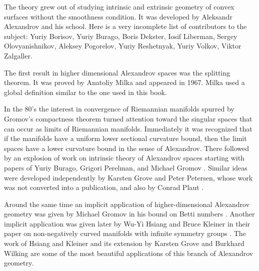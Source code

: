 The theory grew out of studying intrinsic and extrinsic geometry of convex surfaces without the smoothness condition.
It was developed by Aleksandr Alexandrov
and his school.
Here is a very incomplete list of contributors to the subject:
Yuriy  Borisov,
Yuriy  Burago,
Boris Dekster,
Iosif  Liberman,
Sergey  Olovyanishnikov,
Aleksey  Pogorelov,
Yuriy  Reshetnyak,
Yuriy  Volkov,
Viktor  Zalgaller.

The first result in higher dimensional Alexandrov spaces was the splitting theorem.
It was proved by Anatoliy Milka \cite{milka-line} and appeared in 1967.
Milka used a global definition similar to the one used in this book. %

{\sloppy 

In the 80's the interest in convergence of Riemannian manifolds spurred by Gromov's compactness theorem \cite{gromov-MS} turned attention toward the singular spaces that can occur as limits of Riemannian manifolds.
Immediately it was recognized that if the manifolds have a uniform lower sectional curvature bound, then the limit spaces have a lower curvature bound in the sense of Alexandrov. 
There followed by an explosion of work on intrinsic theory of Alexandrov spaces starting with papers of Yuriy Burago, Grigori Perelman, and Michael Gromov  \cite{burago-gromov-perelman,perelman:spaces2}.
Similar ideas were developed independently by Karsten Grove
and Peter Petersen, whose work was not converted into a publication, and also by
Conrad Plaut \cite{plaut-preprint}.

}

Around the same time an implicit application of higher-dimensional Alexandrov geometry was given by Michael Gromov in his bound on Betti numbers \cite{gromov:betti}.
Another implicit application was given later by Wu-Yi Hsiang and Bruce Kleiner in their paper on non-negatively curved manifolds with infinite symmetry groups \cite{hsiang-kleiner}.
The work of Hsiang and Kleiner and its extension by Karsten Grove and Burkhard Wilking \cite{grove-wilking} are some of the most beautiful applications of this branch of Alexandrov geometry.

